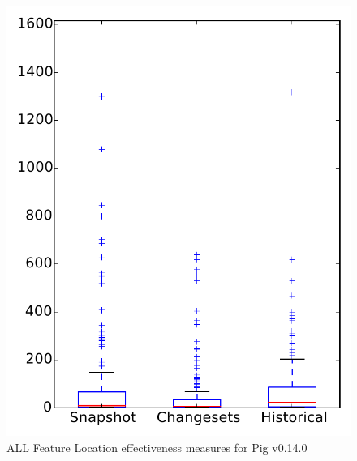 
\begin{figure}
\centering
\includegraphics[height=0.4\textheight]{figures/flt/all_pig}
\caption{ALL Feature Location effectiveness measures for Pig v0.14.0}
\label{fig:flt:all:pig}
\end{figure}
